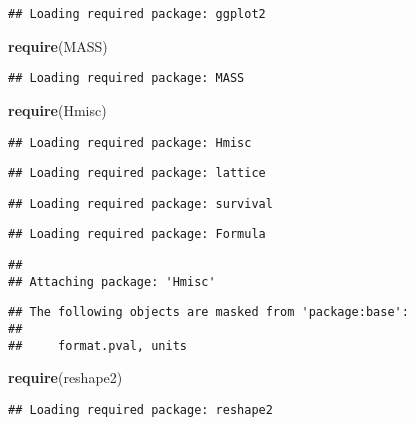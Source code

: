 \documentclass[
]{article}
\newenvironment{Shaded}{\begin{snugshade}}{\end{snugshade}}
\newcommand{\KeywordTok}[1]{\textcolor[rgb]{0.13,0.29,0.53}{\textbf{#1}}}
\newcommand{\NormalTok}[1]{#1}
\begin{document}
\begin{verbatim}
## Loading required package: ggplot2
\end{verbatim}

\begin{Shaded}
\begin{Highlighting}[]
\KeywordTok{require}\NormalTok{(MASS)}
\end{Highlighting}
\end{Shaded}

\begin{verbatim}
## Loading required package: MASS
\end{verbatim}

\begin{Shaded}
\begin{Highlighting}[]
\KeywordTok{require}\NormalTok{(Hmisc)}
\end{Highlighting}
\end{Shaded}

\begin{verbatim}
## Loading required package: Hmisc
\end{verbatim}

\begin{verbatim}
## Loading required package: lattice
\end{verbatim}

\begin{verbatim}
## Loading required package: survival
\end{verbatim}

\begin{verbatim}
## Loading required package: Formula
\end{verbatim}

\begin{verbatim}
## 
## Attaching package: 'Hmisc'
\end{verbatim}

\begin{verbatim}
## The following objects are masked from 'package:base':
## 
##     format.pval, units
\end{verbatim}

\begin{Shaded}
\begin{Highlighting}[]
\KeywordTok{require}\NormalTok{(reshape2)}
\end{Highlighting}
\end{Shaded}

\begin{verbatim}
## Loading required package: reshape2
\end{verbatim}
\end{document}

